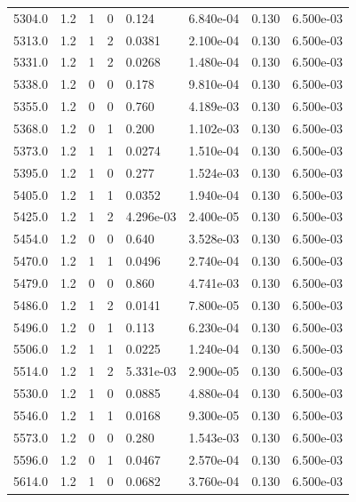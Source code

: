\documentclass[preview]{standalone}
\begin{document}
{{{{{{{{{{\begin{tabular}{L{1.2cm}C{1.2cm} C{0.3cm}C{0.5cm} C{1.4cm}C{1.4cm} C{1.4cm}C{1.4cm}}
  5304.0  &   1.2  & 1     &  0 &  0.124  & 6.840e-04  & 0.130 &  6.500e-03   \\ 
  5313.0  &   1.2  & 1     &  2 &  0.0381  & 2.100e-04  & 0.130 &  6.500e-03   \\ 
  5331.0  &   1.2  & 1     &  2 &  0.0268  & 1.480e-04  & 0.130 &  6.500e-03   \\ 
  5338.0  &   1.2  & 0     &  0 &  0.178  & 9.810e-04  & 0.130 &  6.500e-03   \\ 
  5355.0  &   1.2  & 0     &  0 &  0.760  & 4.189e-03  & 0.130 &  6.500e-03   \\ 
  5368.0  &   1.2  & 0     &  1 &  0.200  & 1.102e-03  & 0.130 &  6.500e-03   \\ 
  5373.0  &   1.2  & 1     &  1 &  0.0274  & 1.510e-04  & 0.130 &  6.500e-03   \\ 
  5395.0  &   1.2  & 1     &  0 &  0.277  & 1.524e-03  & 0.130 &  6.500e-03   \\ 
  5405.0  &   1.2  & 1     &  1 &  0.0352  & 1.940e-04  & 0.130 &  6.500e-03   \\ 
  5425.0  &   1.2  & 1     &  2 &  4.296e-03  & 2.400e-05  & 0.130 &  6.500e-03   \\ 
  5454.0  &   1.2  & 0     &  0 &  0.640  & 3.528e-03  & 0.130 &  6.500e-03   \\ 
  5470.0  &   1.2  & 1     &  1 &  0.0496  & 2.740e-04  & 0.130 &  6.500e-03   \\ 
  5479.0  &   1.2  & 0     &  0 &  0.860  & 4.741e-03  & 0.130 &  6.500e-03   \\ 
  5486.0  &   1.2  & 1     &  2 &  0.0141  & 7.800e-05  & 0.130 &  6.500e-03   \\ 
  5496.0  &   1.2  & 0     &  1 &  0.113  & 6.230e-04  & 0.130 &  6.500e-03   \\ 
  5506.0  &   1.2  & 1     &  1 &  0.0225  & 1.240e-04  & 0.130 &  6.500e-03   \\ 
  5514.0  &   1.2  & 1     &  2 &  5.331e-03  & 2.900e-05  & 0.130 &  6.500e-03   \\ 
  5530.0  &   1.2  & 1     &  0 &  0.0885  & 4.880e-04  & 0.130 &  6.500e-03   \\ 
  5546.0  &   1.2  & 1     &  1 &  0.0168  & 9.300e-05  & 0.130 &  6.500e-03   \\ 
  5573.0  &   1.2  & 0     &  0 &  0.280  & 1.543e-03  & 0.130 &  6.500e-03   \\ 
  5596.0  &   1.2  & 0     &  1 &  0.0467  & 2.570e-04  & 0.130 &  6.500e-03   \\ 
  5614.0  &   1.2  & 1     &  0 &  0.0682  & 3.760e-04  & 0.130 &  6.500e-03   \\ 

\end{tabular}}}}}}}}}}}
\end{document}

